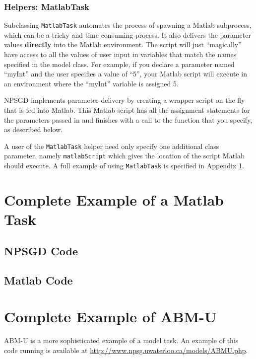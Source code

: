 \documentclass{article}
\newcommand{\mclass}[1]{\texttt{#1}}
\begin{document}
\subsubsection{Helpers: MatlabTask}
Subclassing \mclass{MatlabTask} automates the process of spawning a Matlab
subprocess, which can be a tricky and time consuming process. It also delivers
the parameter values \textbf{directly} into the Matlab environment. The script
will just ``magically'' have access to all the values of user input in variables
that match the names specified in the model class. For example, if you declare a
parameter named ``myInt'' and the user specifies a value of ``5'', your Matlab
script will execute in an environment where the ``myInt'' variable is assigned
5.

NPSGD implements parameter delivery by creating a wrapper script on the fly that
is fed into Matlab. This Matlab script has all the assignment statements for the
parameters passed in and finishes with a call to the function that you specify,
as described below.

A user of the \mclass{MatlabTask} helper need only specify one additional class
parameter, namely \texttt{matlabScript} which gives the location of the script
Matlab should execute. A full example of using \mclass{MatlabTask} is specified
in Appendix \ref{sec:MatlabExample}.

\appendix

\section{Complete Example of a Matlab Task}
\label{sec:MatlabExample}
\subsection{NPSGD Code}


\subsection{Matlab Code}


\section{Complete Example of ABM-U}
ABM-U is a more sophisticated example of a model task. An example of this code
running is available at \url{http://www.npsg.uwaterloo.ca/models/ABMU.php}.

\end{document}
